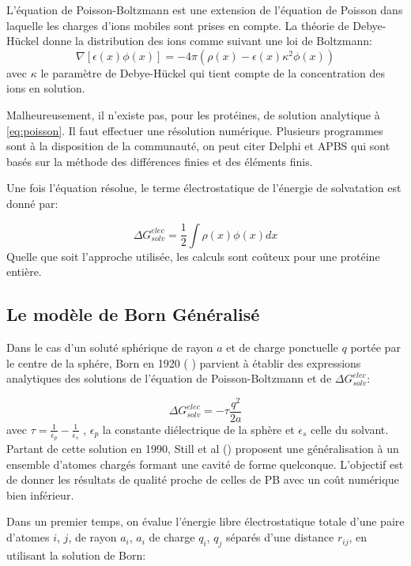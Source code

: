 L'équation de Poisson-Boltzmann est une extension de l'équation de Poisson dans laquelle les charges d'ions mobiles sont prises en compte. La théorie de Debye-Hückel donne la distribution des ions comme suivant une loi de Boltzmann:
\begin{equation}
  \nabla [ \epsilon (x) \phi(x)] = -4 \pi ( \rho(x) - \epsilon(x) \kappa^2 \phi(x))
\end{equation}
avec $ \kappa $ le paramètre de Debye-Hückel qui tient compte de la concentration des ions en solution.

Malheureusement, il n'existe pas, pour les protéines, de solution analytique à \ref{eq:poisson}. Il faut effectuer une résolution numérique. Plusieurs programmes sont à la disposition de la communauté, on peut citer Delphi \cite{Rocchia02} et APBS \cite{Baker01}  qui sont basés sur la méthode des différences finies et des éléments finis.

Une fois l'équation résolue, le terme électrostatique de l'énergie de solvatation est donné par:

\begin{equation}
\Delta G_{solv}^{elec} = \frac{1}{2} \int \rho(x)\phi(x)dx  
\end{equation}
Quelle que soit l'approche utilisée, les calculs sont coûteux pour une protéine entière.


\subsection{Le modèle de Born Généralisé}
\label{sub:GB}
Dans le cas d'un soluté sphérique de rayon $a$ et de charge ponctuelle $q$ portée par le centre de la sphére, Born en 1920 ( \cite{Born20}) parvient à établir des expressions analytiques des solutions de l'équation de Poisson-Boltzmann et de $ \Delta G_{solv}^{elec}$:


\begin{equation}
  \label{eq:Born}
  \Delta G_{solv}^{elec} = - \tau \frac{q^2}{2a}
\end{equation}
avec $ \tau = \frac{1}{\epsilon_p} - \frac{1}{\epsilon_s}$ , $\epsilon_p$ la constante diélectrique de la sphère et $\epsilon_s$ celle du solvant. Partant de cette solution en 1990, Still et al (\cite{Still90}) proposent une généralisation à un ensemble d'atomes chargés formant une cavité de forme quelconque. L'objectif est de donner les résultats de qualité proche de celles de PB avec un coût numérique bien inférieur.

Dans un premier temps, on évalue l'énergie libre électrostatique totale d'une paire d'atomes $i$, $j$, de rayon $a_i$, $a_i$ de charge $q_i$, $q_j$ séparés d'une distance $r_{ij}$, en utilisant la solution de Born:


